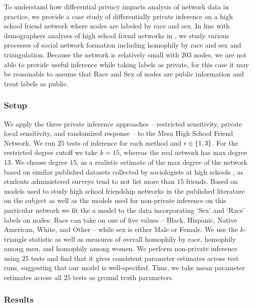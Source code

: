   To understand how differential privacy impacts analysis of network data in practice, we provide a case study of differentially private inference on a high school friend network where nodes are labeled by race and sex. In line with demographers analyses of high school friend networks in \cite{GKM09}, we study various processes of social network formation including homophily by race and sex and triangulation. Because the network is relatively small with $203$ nodes, we are not able to provide useful inference while taking labels as private, for this case it may be reasonable to assume that Race and Sex of nodes are public information and treat labels as public. 
  
 \subsubsection{Setup}
 
 We apply the three private inference approaches -- restricted sensitivity, private local sensitivity, and randomized response -- to the Mesa High School Friend Network. We run $25$ tests of inference for each method and $\epsilon \in \{1,3\}$. For the restricted degree cutoff we take $k=15$, whereas the real network has max degree $13$. We choose degree $15$, as a realistic estimate of the max degree of the network based on similar published datasets collected by sociologists at high schools \cite{ergm}, as students administered surveys tend to not list more than $15$ friends. Based on models used to study high school friendship networks in the published literature on the subject \cite{GKM09} as well as the models used for non-private inference on this particular network \cite{ergm} we fit the a model to the data incorporating `Sex' and `Race' labels on nodes. Race can take on one of five values -- Black, Hispanic, Native American, White, and Other -- while sex is either Male or Female. We use the $k$-triangle statistic as well as measures of overall homophily by race, homophily among men, and homophily among women. We perform non-private inference using $25$ tests and find that it gives consistent parameter estimates across test runs, suggesting that our model is well-specified. Thus, we take mean parameter estimates across all $25$ tests as ground truth parameters. 
 
  \subsubsection{Results}
	
